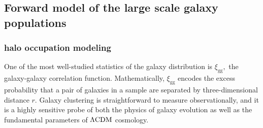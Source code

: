 

\subsection{Forward model of the large scale galaxy populations}\label{sec:halo}
\subsubsection{halo occupation modeling}

\newcommand{\lcdm}{\Lambda {\rm CDM}}
\newcommand{\dd}{\mathrm{d}}
\newcommand{\mean}[2]{\left\langle#1 \vert {#2}\right\rangle}

\newcommand{\ngal}{N_{\mathrm{g}}}
\newcommand{\nsat}{N_\mathrm{s}}
\newcommand{\ncen}{N_\mathrm{c}}
\newcommand{\pnm}[2]{P(#1|#2)}

\newcommand{\mhalo}{M_{\rm h}}
\newcommand{\mvir}{M_\mathrm{vir}} 

\newcommand{\dndmvir}{\frac{\dd n}{\dd\mvir}}
\newcommand{\dndmhalo}{\frac{\dd n}{\dd\mhalo}}
\newcommand{\dndmvirprime}{\frac{\dd n}{\dd\mvir'}}

\newcommand{\xigg}{\xi_{\mathrm{gg}}}
\newcommand{\xihh}{\xi_{\mathrm{hh}}}
\newcommand{\xiggr}{\xi_{\mathrm{gg}}(r)}
\newcommand{\xiggroneh}{\xi^{1h}_{\mathrm{gg}}(r)}
\newcommand{\xiggrtwoh}{\xi^{2h}_{\mathrm{gg}}(r)}
\newcommand{\ngalaxy}{\bar{n}_{\mathrm{g}}}

One of the most well-studied statistics of the galaxy distribution 
is $\xigg,$ the galaxy-galaxy correlation function. Mathematically, $\xigg$ encodes the
excess probability that a pair of galaxies in a sample are 
separated by three-dimensional distance $r.$ 
Galaxy clustering is straightforward to measure observationally, 
and it is a highly sensitive probe of both the physics of galaxy evolution 
as well as the fundamental parameters of $\lcdm$ cosmology. 

